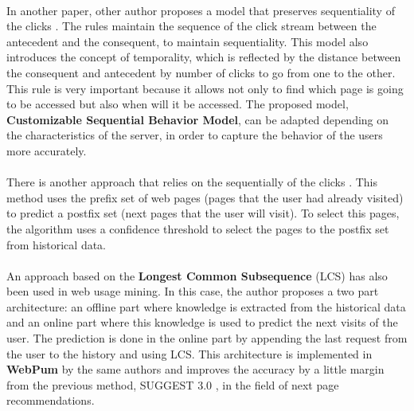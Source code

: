 \paragraph{}

In another paper, other author proposes a model that preserves sequentiality of
the clicks \cite{Frias-Martinez2003}. The rules maintain the sequence of the
click stream between the antecedent and the consequent, to maintain sequentiality.
This model also introduces the concept of temporality, which is reflected by the
distance between the consequent and antecedent by number of clicks to go from one
to the other. This rule is very important because it allows not only to find
which page is  going to be accessed but also when will it be accessed. The proposed
model, \textbf{Customizable Sequential Behavior Model}, can be adapted depending
on the characteristics of the server, in order to capture the behavior of the
users more accurately.

\paragraph{}

There is another approach that relies on the sequentially of the clicks
\cite{Jan:2007:WUB:1353862.1353874}.
This method uses the prefix set of web pages (pages that the user had already
visited) to predict a postfix set (next pages that the user will visit).
To select this pages, the algorithm uses a confidence threshold to select the pages
to the postfix set from historical data.


\paragraph{}

An approach based on the \textbf{Longest Common Subsequence} (LCS)
\cite{4631852} has also been used in web usage mining. In this case, the author
proposes a two part architecture: an offline part where knowledge is extracted
from the historical data and an online part where this knowledge is used to
predict the next visits of the user. The prediction is done in the online part by
appending the last request from the user to the history and using LCS. This
architecture is implemented in \textbf{WebPum} \cite{Jalali20106201} by the same
authors and improves the accuracy by a little margin from the
previous method, SUGGEST 3.0 \cite{1410804}, in the field of next page recommendations.

\paragraph{}

